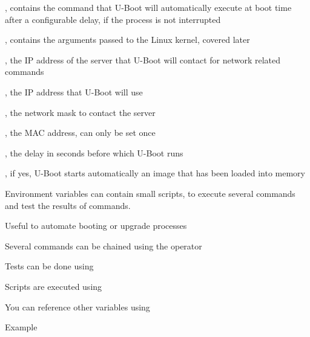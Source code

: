   \startitemize
  \item {}, contains the command that U-Boot will
    automatically execute at boot time after a configurable delay, if
    the process is not interrupted
  \item {}, contains the arguments passed to the Linux
    kernel, covered later
  \item {}, the IP address of the server that U-Boot will
    contact for network related commands
  \item {}, the IP address that U-Boot will use
  \item {}, the network mask to contact the server
  \item {}, the MAC address, can only be set once
  \item {}, the delay in seconds before which U-Boot
    runs 
  \item {}, if yes, U-Boot starts automatically an image
    that has been loaded into memory
  \stopitemize

  \startitemize
  \item Environment variables can contain small scripts, to execute
    several commands and test the results of commands.
    \startitemize
    \item Useful to automate booting or upgrade processes
    \item Several commands can be chained using the \type{;} operator
    \item Tests can be done using
    \item Scripts are executed using 
    \item You can reference other variables using
    \stopitemize
  \item Example
    \startitemize
    \item {}
  \stopitemize
\stopitemize

